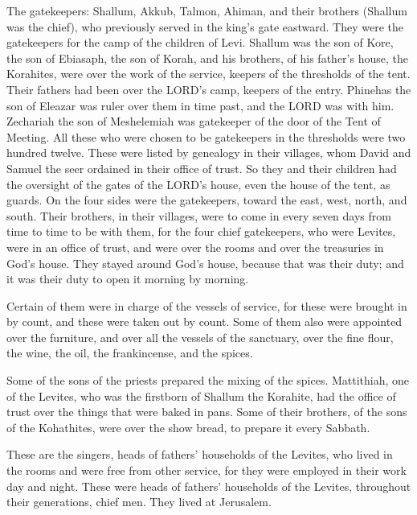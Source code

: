 \myverse{}The gatekeepers: Shallum, Akkub, Talmon, Ahiman, and their brothers
(Shallum was the chief),
\myverse{}who previously served in the king’s gate eastward. They were the gatekeepers
for the camp of the children of Levi.
\myverse{}Shallum was the son of Kore, the son of Ebiasaph, the son of Korah, and his
brothers, of his father’s house, the Korahites, were over the work of the service, keepers of the thresholds
of the tent. Their fathers had been over the LORD’s camp, keepers of the entry.
\myverse{}Phinehas the son of Eleazar was ruler over them in time past, and the LORD
was with him.
\myverse{}Zechariah the son of Meshelemiah was gatekeeper of the door of the Tent of
Meeting.
\myverse{}All these who were chosen to be gatekeepers in the thresholds were two hundred
twelve. These were listed by genealogy in their villages, whom David and Samuel the seer ordained in their
office of trust.
\myverse{}So they and their children had the oversight of the gates of the LORD’s house,
even the house of the tent, as guards.
\myverse{}On the four sides were the gatekeepers, toward the east, west, north, and
south.
\myverse{}Their brothers, in their villages, were to come in every seven days from time
to time to be with them,
\myverse{}for the four chief gatekeepers, who were Levites, were in an office of trust,
and were over the rooms and over the treasuries in God’s house.
\myverse{}They stayed around God’s house, because that was their duty; and it was their
duty to open it morning by morning.

\myverse{}Certain of them were in charge of the vessels of service, for
these were brought in by count, and these were taken out by count.
\myverse{}Some of them also were appointed over the furniture, and over all the vessels
of the sanctuary, over the fine flour, the wine, the oil, the frankincense, and the spices.

\myverse{}Some of the sons of the priests prepared the mixing of the spices.
\myverse{}Mattithiah, one of the Levites, who was the firstborn of Shallum the Korahite,
had the office of trust over the things that were baked in pans.
\myverse{}Some of their brothers, of the sons of the Kohathites, were over the show
bread, to prepare it every Sabbath.

\myverse{}These are the singers, heads of fathers’ households of the Levites,
who lived in the rooms and were free from other service, for they were employed in their work day and
night.
\myverse{}These were heads of fathers’ households of the Levites, throughout their generations,
chief men. They lived at Jerusalem.

